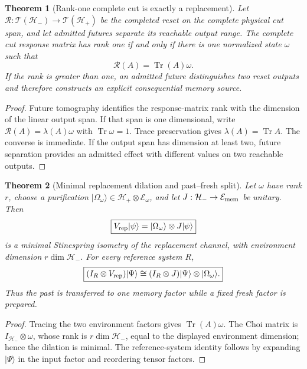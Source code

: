 \documentclass[11pt]{article}
\newtheorem{theorem}{Theorem}[section]
\theoremstyle{definition}
\theoremstyle{remark}
\newcommand{\Tr}{\operatorname{Tr}}
\newcommand{\Hh}{\mathcal H}
\begin{document}
\begin{theorem}[Rank-one complete cut is exactly a replacement]
\label{thm:rank-one-cut-replacement-master}
Let
$\mathcal R:\mathcal T(\Hh_-)\to\mathcal T(\Hh_+)$ be the completed reset on
the complete physical cut span, and let admitted futures separate its reachable
output range.  The complete cut response matrix has rank one if and only if
there is one normalized state $\omega$ such that
\[
 \boxed{\mathcal R(A)=\Tr(A)\omega.}
\]
If the rank is greater than one, an admitted future distinguishes two reset
outputs and therefore constructs an explicit consequential memory source.
\end{theorem}

\begin{proof}
Future tomography identifies the response-matrix rank with the dimension of the
linear output span.  If that span is one dimensional, write
$\mathcal R(A)=\lambda(A)\omega$ with $\Tr\omega=1$.  Trace preservation gives
$\lambda(A)=\Tr A$.  The converse is immediate.  If the output span has
dimension at least two, future separation provides an admitted effect with
different values on two reachable outputs.
\end{proof}

\begin{theorem}[Minimal replacement dilation and past--fresh split]
\label{thm:replacement-dilation-master}
Let $\omega$ have rank $r$, choose a purification
$|\Omega_\omega\rangle\in\Hh_+\otimes\mathcal E_\omega$, and let
$J:\Hh_-\to\mathcal E_{\rm mem}$ be unitary.  Then
\[
 \boxed{V_{\rm rep}|\psi\rangle
 =|\Omega_\omega\rangle\otimes J|\psi\rangle}
\]
is a minimal Stinespring isometry of the replacement channel, with environment
dimension $r\dim\Hh_-$.  For every reference system $R$,
\[
 \boxed{(I_R\otimes V_{\rm rep})|\Psi\rangle
 \cong (I_R\otimes J)|\Psi\rangle\otimes|\Omega_\omega\rangle.}
\]
Thus the past is transferred to one memory factor while a fixed fresh factor is
prepared.
\end{theorem}

\begin{proof}
Tracing the two environment factors gives $\Tr(A)\omega$.  The Choi matrix is
$I_{\Hh_-}\otimes\omega$, whose rank is $r\dim\Hh_-$, equal to the displayed
environment dimension; hence the dilation is minimal.  The reference-system
identity follows by expanding $|\Psi\rangle$ in the input factor and reordering
tensor factors.
\end{proof}
\end{document}
